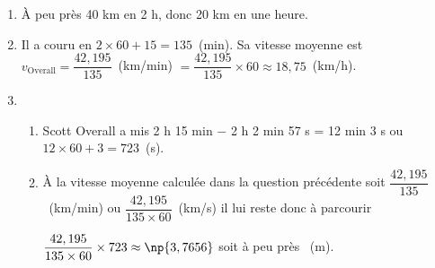 
\medskip

%

\begin{enumerate}
\item %
À peu près 40 km en 2 h, donc 20 km en une heure.
\item %
Il a couru en $2 \times 60 + 15 = 135$~(min). Sa vitesse moyenne est $v_{\text{Overall}} = \dfrac{42,195}{135}$~(km/min) $ = \dfrac{42,195}{135} \times 60 \approx 18,75$~(km/h).
\item %
	\begin{enumerate}
		\item %
		Scott Overall a mis 2 h 15 min $-$ 2 h 2 min 57 s = 12 min 3 s ou $12 \times 60 + 3 = 723$~(s).
		\item %
		À la vitesse moyenne calculée dans la question précédente soit $\dfrac{42,195}{135}$~(km/min) ou $\dfrac{42,195}{135 \times 60}$~(km/s) il lui reste donc à parcourir
		
$\dfrac{42,195}{135 \times 60} \times 723 \approx \np{3,7656}$ soit à peu près ~(m).	
	\end{enumerate}
\end{enumerate}

\vspace{0,5cm}

